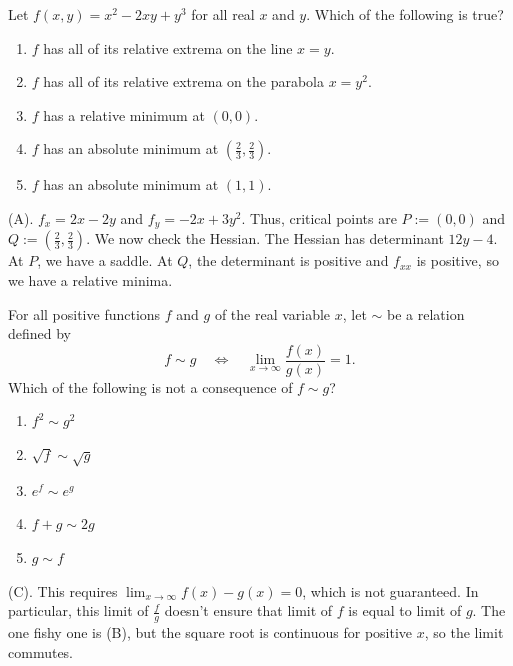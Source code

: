 \begin{exercise}
Let $f(x,y)=x^2-2xy+y^3$ for all real $x$ and $y$. Which of the following is true?
\begin{enumerate}[label=(\Alph*)]
    \item $f$ has all of its relative extrema on the line $x=y$.
    \item $f$ has all of its relative extrema on the parabola $x=y^2$.
    \item $f$ has a relative minimum at $(0,0)$.
    \item $f$ has an absolute minimum at $\left(\frac{2}{3},\frac{2}{3}\right)$.
    \item $f$ has an absolute minimum at $(1,1)$.
\end{enumerate}
\end{exercise}
\begin{solution}
(A). $f_x = 2x - 2y$ and $f_y = -2x + 3y^2$. Thus, critical points are 
$P:=(0,0)$ and $Q:=\left( \frac{2}{3}, \frac{2}{3}\right)$. We now check the Hessian.
The Hessian has determinant $12y - 4$. At $P$, we have a saddle. At $Q$, the 
determinant is positive and $f_{xx}$ is positive, so we have a relative minima.
\end{solution}

\begin{exercise}
For all positive functions $f$ and $g$ of the real variable $x$, let $\sim$
be a relation defined by
\[
f\sim g
\quad\Longleftrightarrow\quad
\lim_{x\to\infty}\frac{f(x)}{g(x)}=1.
\]
Which of the following is not a consequence of $f\sim g$?
\begin{enumerate}[label=(\Alph*)]
    \item $f^2\sim g^2$
    \item $\sqrt{f}\sim\sqrt{g}$
    \item $e^f\sim e^g$
    \item $f+g\sim 2g$
    \item $g\sim f$
\end{enumerate}
\end{exercise}
\begin{solution}
(C). This requires $\lim_{x \rightarrow \infty} f(x) - g(x) = 0$, which is not guaranteed.
In particular, this limit of $\frac{f}{g}$ doesn't ensure that limit of $f$ is equal to limit of $g$.
The one fishy one is (B), but the square root is continuous for positive $x$, so the limit commutes.
\end{solution}

